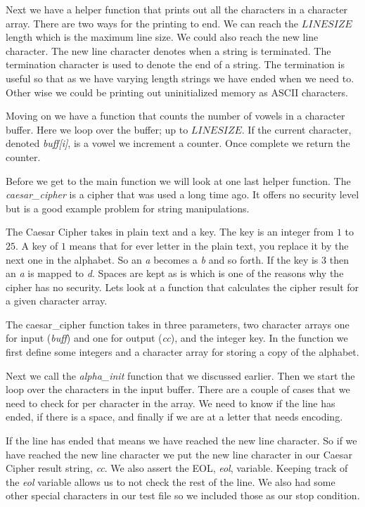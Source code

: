 Next we have a helper function that prints out all the characters in a character array. There are two ways for the printing to end. We can reach the $LINESIZE$ length which is the maximum line size. We could also reach the new line character. The new line character denotes when a string is terminated. The termination character is used to denote the end of a string. The termination is useful so that as we have varying length strings we have ended when we need to. Other wise we could be printing out uninitialized memory as \ac{ASCII} characters. 

Moving on we have a function that counts the number of vowels in a character buffer. Here we loop over the buffer; up to $LINESIZE$. If the current character, denoted \emph{buff[i]}, is a vowel we increment a counter. Once complete we return the counter. 

Before we get to the main function we will look at one last helper function. The \emph{caesar\_cipher} is a cipher that was used a long time ago. It offers no security level but is a good example problem for string manipulations. 

The Caesar Cipher takes in plain text and a key. The key is an integer from $1$ to $25$. A key of $1$ means that for ever letter in the plain text, you replace it by the next one in the alphabet. So an \emph{a} becomes a \emph{b} and so forth. If the key is $3$ then an \emph{a} is mapped to \emph{d}. Spaces are kept as is which is one of the reasons why the cipher has no security. Lets look at a function that calculates the cipher result for a given character array. 

The caesar\_cipher function takes in three parameters, two character arrays one for input (\emph{buff}) and one for output (\emph{cc}), and the integer key. In the function we first define some integers and a character array for storing a copy of the alphabet. 

Next we call the \emph{alpha\_init} function that we discussed earlier. Then we start the loop over the characters in the input buffer. There are a couple of cases that we need to check for per character in the array. We need to know if the line has ended, if there is a space, and finally if we are at a letter that needs encoding. 

If the line has ended that means we have reached the new line character. So if we have reached the new line character we put the new line character in our Caesar Cipher result string, \emph{cc}. We also assert the \ac{EOL}, \emph{eol}, variable. Keeping track of the \emph{eol} variable allows us to not check the rest of the line. We also had some other special characters in our test file so we included those as our stop condition. 

